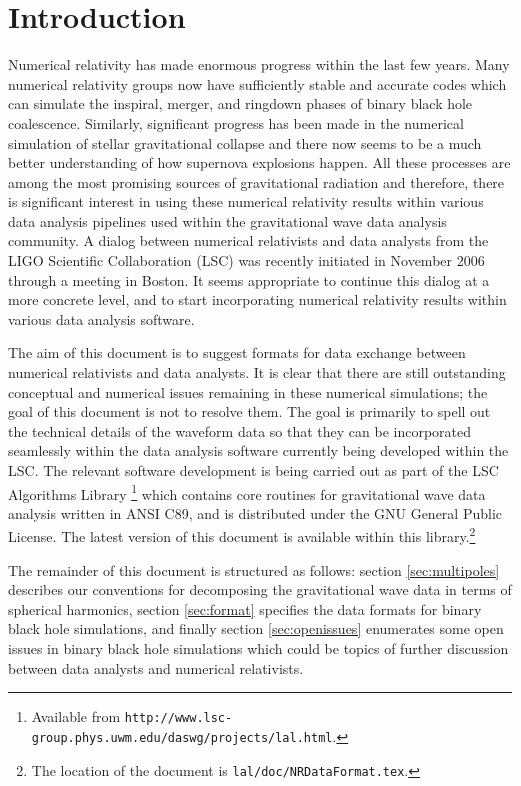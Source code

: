 \documentclass[prd,preprintnumbers,superscriptaddress,eqsecnum]{revtex4}
\numberwithin{equation}{section}
\begin{document}
\section{Introduction}
\label{sec:intro}

Numerical relativity has made enormous progress within the last few
years. Many numerical relativity groups now have sufficiently stable
and accurate codes which can simulate the inspiral, merger, and
ringdown phases of binary black hole coalescence. Similarly,
significant progress has been made in the numerical simulation of
stellar gravitational collapse and there now seems to be a much better
understanding of how supernova explosions happen. All these processes
are among the most promising sources of gravitational radiation and
therefore, there is significant interest in using these numerical
relativity results within various data analysis pipelines used within
the gravitational wave data analysis community. A dialog between
numerical relativists and data analysts from the LIGO Scientific
Collaboration (LSC) was recently initiated in November 2006 through a
meeting in Boston. It seems appropriate to continue this dialog at a
more concrete level, and to start incorporating numerical relativity
results within various data analysis software.

The aim of this document is to suggest formats for data exchange
between numerical relativists and data analysts. It is clear that
there are still outstanding conceptual and numerical issues remaining
in these numerical simulations; the goal of this document is not to
resolve them. The goal is primarily to spell out the technical
details of the waveform data so that they can be incorporated
seamlessly within the data analysis software currently being developed
within the LSC. The relevant software development is being carried
out as part of the LSC Algorithms Library \footnote{Available from
 \texttt{http://www.lsc-group.phys.uwm.edu/daswg/projects/lal.html}.}
which contains core routines for gravitational wave data analysis
written in ANSI C89, and is distributed under the GNU General Public
License. The latest version of this document is available within this
library.\footnote{The location of the document is
 \texttt{lal/doc/NRDataFormat.tex}.}

The remainder of this document is structured as follows: section
\ref{sec:multipoles} describes our conventions for decomposing the
gravitational wave data in terms of spherical harmonics, section
\ref{sec:format} specifies the data formats for binary black hole
simulations, and finally section \ref{sec:openissues} enumerates some
open issues in binary black hole simulations which could be topics of
further discussion between data analysts and numerical relativists.
\end{document}
